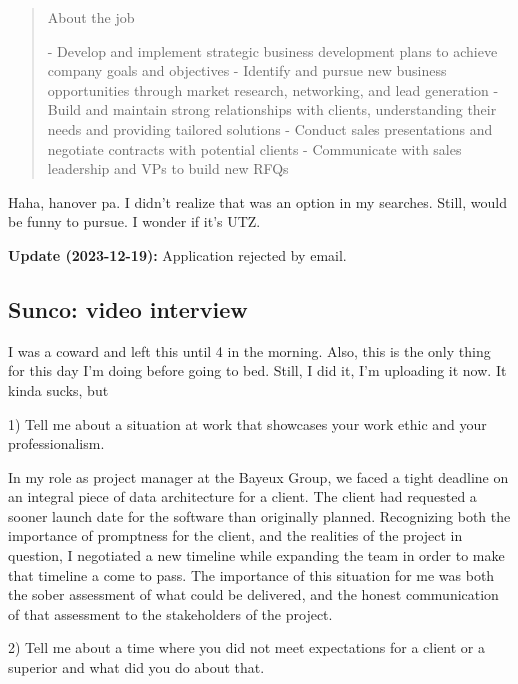 \documentclass[
	letterpaper, %
	12pt, %
]{CSSullivanBusinessReport}
\begin{document}
\begin{quote}
	About the job
	
	- Develop and implement strategic business development plans to achieve company goals and objectives
	- Identify and pursue new business opportunities through market research, networking, and lead generation
	- Build and maintain strong relationships with clients, understanding their needs and providing tailored solutions
	- Conduct sales presentations and negotiate contracts with potential clients
	- Communicate with sales leadership and VPs to build new RFQs

\end{quote}

Haha, hanover pa. I didn't realize that was an option in my searches. Still, would be funny to pursue. I wonder if it's UTZ.

\textbf{Update (2023-12-19):} Application rejected by email.



\subsection[Sunco]{Sunco: video interview}

I was a coward and left this until 4 in the morning. Also, this is the only thing for this day I'm doing before going to bed. Still, I did it, I'm uploading it now. It kinda sucks, but

1) Tell me about a situation at work that showcases your work ethic and your professionalism.

In my role as project manager at the Bayeux Group, we faced a tight deadline on an integral piece of data architecture for a client. The client had requested a sooner launch date for the software than originally planned. Recognizing both the importance of promptness for the client, and the realities of the project in question, I negotiated a new timeline while expanding the team in order to make that timeline a come to pass. The importance of this situation for me was both the sober assessment of what could be delivered, and the honest communication of that assessment to the stakeholders of the project. 

2) Tell me about a time where you did not meet expectations for a client or a superior and what did you do about that.
\end{document}
